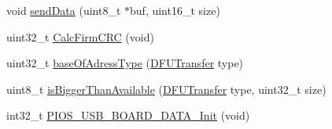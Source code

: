 \begin{DoxyCompactItemize}
\item 
void \hyperlink{group___revo_mini_b_l_gaa1fa853082b4ce777706ba08c91fb0b8}{send\-Data} (uint8\-\_\-t $\ast$buf, uint16\-\_\-t size)
\item 
uint32\-\_\-t \hyperlink{group___revo_mini_b_l_ga9eb702c0c89bbf54545553d141c5cfa6}{\-Calc\-Firm\-C\-R\-C} (void)
\item 
uint32\-\_\-t \hyperlink{group___revo_mini_b_l_ga90ec1a350e3192abce917e9f10b989ec}{base\-Of\-Adress\-Type} (\hyperlink{group___copter_control_b_l_ga0b23a3b03386f81782f1b57b69804064}{\-D\-F\-U\-Transfer} type)
\item 
uint8\-\_\-t \hyperlink{group___revo_mini_b_l_ga8122c172146d51c7fc782ad4981162a6}{is\-Bigger\-Than\-Available} (\hyperlink{group___copter_control_b_l_ga0b23a3b03386f81782f1b57b69804064}{\-D\-F\-U\-Transfer} type, uint32\-\_\-t size)
\item 
int32\-\_\-t \hyperlink{group___revo_mini_b_l_ga5efd94ab761f254827f38dba474cf642}{\-P\-I\-O\-S\-\_\-\-U\-S\-B\-\_\-\-B\-O\-A\-R\-D\-\_\-\-D\-A\-T\-A\-\_\-\-Init} (void)
\end{DoxyCompactItemize}
